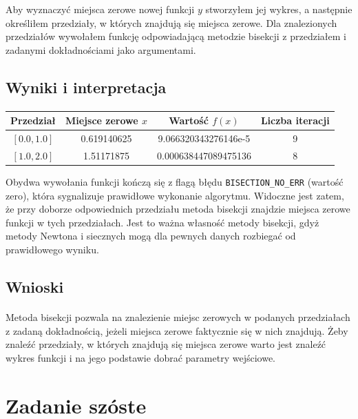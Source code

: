 \documentclass[a4paper]{article}
\begin{document}
Aby wyznaczyć miejsca zerowe nowej funkcji $y$ stworzyłem jej wykres, a następnie określiłem przedziały, w których znajdują się miejsca zerowe. Dla znalezionych przedziałów wywołałem funkcję odpowiadającą metodzie bisekcji z przedziałem i zadanymi dokładnościami jako argumentami.

\subsection{Wyniki i interpretacja}
\paragraph{}

\begin{center}
 \begin{tabular}{ |c | c | c | c|  }
 \hline
  Przedział & Miejsce zerowe $x$ & Wartość $f(x)$ & Liczba iteracji\\
 \hline
 $[0.0, 1.0]$ & 0.619140625 & 9.066320343276146e-5 & 9\\
 $[1.0, 2.0]$ & 1.51171875 & 0.000638447089475136 & 8 \\
 \hline
\end{tabular}
\end{center}

Obydwa wywołania funkcji kończą się z flagą błędu \texttt{BISECTION\_NO\_ERR} (wartość zero), która sygnalizuje prawidłowe wykonanie algorytmu. Widoczne jest zatem, że przy doborze odpowiednich przedziału metoda bisekcji znajdzie miejsca zerowe funkcji w tych przedziałach. Jest to ważna własność metody bisekcji, gdyż metody Newtona i siecznych mogą dla pewnych danych rozbiegać od prawidłowego wyniku.


\subsection{Wnioski}
\paragraph{}
Metoda bisekcji pozwala na znalezienie miejsc zerowych w podanych przedziałach z zadaną dokładnością, jeżeli miejsca zerowe faktycznie się w nich znajdują. Żeby znaleźć przedziały, w których znajdują się miejsca zerowe warto jest znaleźć wykres funkcji i na jego podstawie dobrać parametry wejściowe.

\section{Zadanie szóste}
\end{document}
